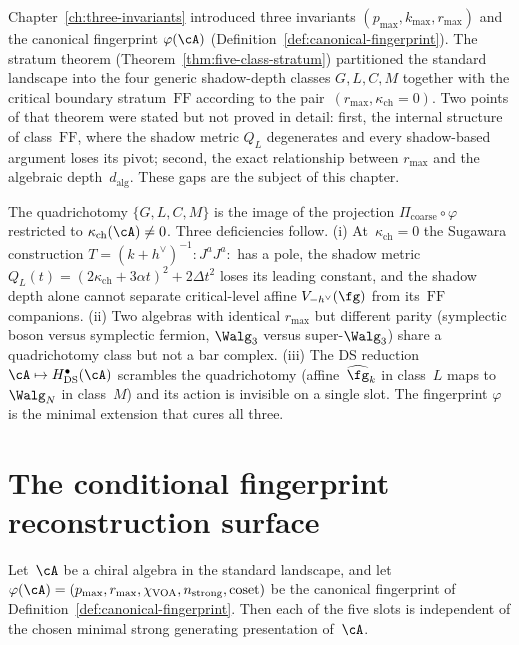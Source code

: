 Chapter~\ref{ch:three-invariants} introduced three invariants
$(p_{\max}, k_{\max}, r_{\max})$ and the canonical fingerprint
$\varphi(\cA)$
\textup{(}Definition~\ref{def:canonical-fingerprint}\textup{)}. The
stratum theorem
\textup{(}Theorem~\ref{thm:five-class-stratum}\textup{)} partitioned
the standard landscape into the four generic shadow-depth classes
$G,L,C,M$ together with the critical boundary stratum~$\mathrm{FF}$
according to the pair~$(r_{\max}, \kappa_{\mathrm{ch}} = 0)$. Two points of that
theorem were stated but not proved in detail: first, the
internal structure of class~$\mathrm{FF}$, where the shadow metric
$Q_L$ degenerates and every shadow-based argument loses its pivot;
second, the exact relationship between $r_{\max}$ and the algebraic
depth~$d_{\mathrm{alg}}$. These gaps are the subject of this
chapter.

\begin{remark}
\label{rem:why-quadrichotomy-insufficient}
The quadrichotomy $\{G,L,C,M\}$ is the image of the projection
$\Pi_{\mathrm{coarse}}\circ\varphi$ restricted to
$\kappa_{\mathrm{ch}}(\cA)\neq 0$. Three deficiencies follow. (i)
At~$\kappa_{\mathrm{ch}}=0$ the Sugawara construction
$T = (k+h^\vee)^{-1}:\!J^aJ^a\!:$ has a pole, the shadow metric
$Q_L(t) = (2\kappa_{\mathrm{ch}} + 3\alpha t)^2 + 2\Delta t^2$
loses its leading constant, and the shadow depth alone cannot
separate critical-level affine $V_{-h^\vee}(\fg)$ from
its~$\mathrm{FF}$ companions. (ii) Two algebras with identical
$r_{\max}$ but different parity (symplectic boson versus symplectic
fermion, $\Walg_3$ versus super-$\Walg_3$) share a quadrichotomy
class but not a bar complex. (iii) The DS reduction
$\cA\mapsto H^\bullet_{\mathrm{DS}}(\cA)$ scrambles the quadrichotomy
(affine~$\widehat{\fg}_k$ in class~$L$ maps to~$\Walg_N$ in
class~$M$) and its action is invisible on a single slot.
The fingerprint $\varphi$ is the minimal extension that cures
all three.
\end{remark}

\section{The conditional fingerprint reconstruction surface}
\label{sec:fingerprint-is-complete-invariant}

\begin{lemma}
\label{lem:fingerprint-slot-presentation-independence}
\ClaimStatusConditional
Let~$\cA$ be a chiral algebra in the standard landscape, and let
$\varphi(\cA)
= (p_{\max}, r_{\max}, \chi_{\mathrm{VOA}}, n_{\mathrm{strong}}, \mathrm{coset})$
be the canonical fingerprint of
Definition~\ref{def:canonical-fingerprint}. Then each of the five
slots is independent of the chosen minimal strong generating
presentation of~$\cA$.
\end{lemma}

